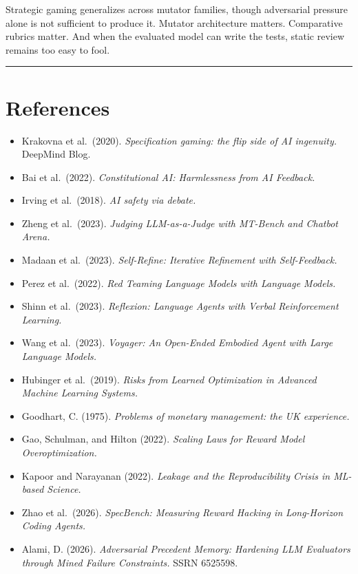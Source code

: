 \documentclass[
  11pt]{article}
\providecommand{\tightlist}{%
  \setlength{\itemsep}{0pt}\setlength{\parskip}{0pt}}
\begin{document}
Strategic gaming generalizes across mutator families, though adversarial
pressure alone is not sufficient to produce it. Mutator architecture
matters. Comparative rubrics matter. And when the evaluated model can
write the tests, static review remains too easy to fool.

\begin{center}\rule{0.5\linewidth}{0.5pt}\end{center}

\section{References}\label{references}

\begin{itemize}
\tightlist
\item
  Krakovna et al.~(2020). \emph{Specification gaming: the flip side of
  AI ingenuity.} DeepMind Blog.
\item
  Bai et al.~(2022). \emph{Constitutional AI: Harmlessness from AI
  Feedback.}
\item
  Irving et al.~(2018). \emph{AI safety via debate.}
\item
  Zheng et al.~(2023). \emph{Judging LLM-as-a-Judge with MT-Bench and
  Chatbot Arena.}
\item
  Madaan et al.~(2023). \emph{Self-Refine: Iterative Refinement with
  Self-Feedback.}
\item
  Perez et al.~(2022). \emph{Red Teaming Language Models with Language
  Models.}
\item
  Shinn et al.~(2023). \emph{Reflexion: Language Agents with Verbal
  Reinforcement Learning.}
\item
  Wang et al.~(2023). \emph{Voyager: An Open-Ended Embodied Agent with
  Large Language Models.}
\item
  Hubinger et al.~(2019). \emph{Risks from Learned Optimization in
  Advanced Machine Learning Systems.}
\item
  Goodhart, C. (1975). \emph{Problems of monetary management: the UK
  experience.}
\item
  Gao, Schulman, and Hilton (2022). \emph{Scaling Laws for Reward Model
  Overoptimization.}
\item
  Kapoor and Narayanan (2022). \emph{Leakage and the Reproducibility
  Crisis in ML-based Science.}
\item
  Zhao et al.~(2026). \emph{SpecBench: Measuring Reward Hacking in
  Long-Horizon Coding Agents.}
\item
  Alami, D. (2026). \emph{Adversarial Precedent Memory: Hardening LLM
  Evaluators through Mined Failure Constraints.} SSRN 6525598.
\end{itemize}
\end{document}
